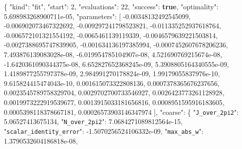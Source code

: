 \documentclass[
  10pt,
]{article}
\newenvironment{Shaded}{}{}
\newcommand{\DataTypeTok}[1]{\textcolor[rgb]{0.56,0.13,0.00}{#1}}
\newcommand{\DecValTok}[1]{\textcolor[rgb]{0.25,0.63,0.44}{#1}}
\newcommand{\FloatTok}[1]{\textcolor[rgb]{0.25,0.63,0.44}{#1}}
\newcommand{\FunctionTok}[1]{\textcolor[rgb]{0.02,0.16,0.49}{#1}}
\newcommand{\KeywordTok}[1]{\textcolor[rgb]{0.00,0.44,0.13}{\textbf{#1}}}
\newcommand{\OtherTok}[1]{\textcolor[rgb]{0.00,0.44,0.13}{#1}}
\newcommand{\StringTok}[1]{\textcolor[rgb]{0.25,0.44,0.63}{#1}}
\begin{document}
\begin{Shaded}
\begin{Highlighting}[]
\FunctionTok{\{}
  \DataTypeTok{"kind"}\FunctionTok{:} \StringTok{"fit"}\FunctionTok{,}
  \DataTypeTok{"start"}\FunctionTok{:} \DecValTok{2}\FunctionTok{,}
  \DataTypeTok{"evaluations"}\FunctionTok{:} \DecValTok{22}\FunctionTok{,}
  \DataTypeTok{"success"}\FunctionTok{:} \KeywordTok{true}\FunctionTok{,}
  \DataTypeTok{"optimality"}\FunctionTok{:} \FloatTok{5.698983268900711e{-}05}\FunctionTok{,}
  \DataTypeTok{"parameters"}\FunctionTok{:} \OtherTok{[}
    \FloatTok{{-}0.00348132492545099}\OtherTok{,}
    \FloatTok{{-}0.006902073467322692}\OtherTok{,}
    \FloatTok{{-}0.009297241798523821}\OtherTok{,}
    \FloatTok{{-}0.011335252937618764}\OtherTok{,}
    \FloatTok{{-}0.006572101321554192}\OtherTok{,}
    \FloatTok{{-}0.0065461139119339}\OtherTok{,}
    \FloatTok{{-}0.0046579639221503814}\OtherTok{,}
    \FloatTok{{-}0.0027388695747839905}\OtherTok{,}
    \FloatTok{{-}0.001634136197385994}\OtherTok{,}
    \FloatTok{{-}0.0007452607678206236}\OtherTok{,}
    \FloatTok{7.493876139083028e{-}08}\OtherTok{,}
    \FloatTok{{-}6.019954785104907e{-}08}\OtherTok{,}
    \FloatTok{4.521690769215674e{-}08}\OtherTok{,}
    \FloatTok{{-}1.6420361090344375e{-}08}\OtherTok{,}
    \FloatTok{6.652827652368245e{-}09}\OtherTok{,}
    \FloatTok{5.3908805164340555e{-}09}\OtherTok{,}
    \FloatTok{1.4189877255797378e{-}09}\OtherTok{,}
    \FloatTok{2.984991270178824e{-}09}\OtherTok{,}
    \FloatTok{1.99179055837976e{-}10}\OtherTok{,}
    \FloatTok{9.615824415474043e{-}10}\OtherTok{,}
    \FloatTok{0.001615073322808136}\OtherTok{,}
    \FloatTok{0.0007378365676237656}\OtherTok{,}
    \FloatTok{0.0023545789758329704}\OtherTok{,}
    \FloatTok{0.0029702700733546927}\OtherTok{,}
    \FloatTok{0.0026423773261128928}\OtherTok{,}
    \FloatTok{0.0019973222919539677}\OtherTok{,}
    \FloatTok{0.0013915033181656816}\OtherTok{,}
    \FloatTok{0.0008951595916183605}\OtherTok{,}
    \FloatTok{0.0005398118378667181}\OtherTok{,}
    \FloatTok{0.00026573903146347974}
  \OtherTok{]}\FunctionTok{,}
  \DataTypeTok{"coarse"}\FunctionTok{:} \FunctionTok{\{}
    \DataTypeTok{"\nolinkurl{J_over_2pi2}"}\FunctionTok{:} \FloatTok{5.06527413675134}\FunctionTok{,}
    \DataTypeTok{"\nolinkurl{N_over_2pi2}"}\FunctionTok{:} \FloatTok{7.0684271089812564e{-}15}\FunctionTok{,}
    \DataTypeTok{"\nolinkurl{scalar_identity_error}"}\FunctionTok{:} \FloatTok{{-}1.5070256524106332e{-}09}\FunctionTok{,}
    \DataTypeTok{"\nolinkurl{max_abs_w}"}\FunctionTok{:} \FloatTok{1.3790532604186818e{-}08}\FunctionTok{,}

\end{Highlighting}
\end{Shaded}
\end{document}
